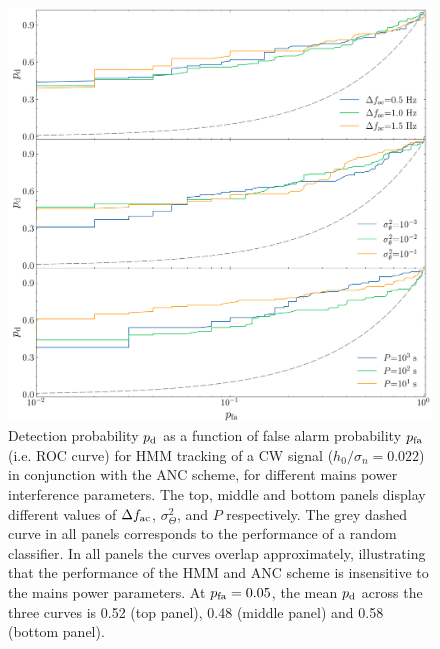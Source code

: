 \documentclass[pra,superscriptaddress,reprint,amsmath,amssymb,nofootinbib]{revtex4-2}
\begin{document}
\begin{figure}
	\begin{center}
		\includegraphics[width=\columnwidth]{images/roc_curve_mains_power_params}
	\end{center}
	\caption{Detection probability $p_{\rm d}$ as a function of false alarm probability $p_{\rm fa}$ (i.e. ROC curve) for HMM tracking of a CW signal ($h_0 / \sigma_n = 0.022$) in conjunction with the ANC scheme, for different mains power interference parameters. The top, middle and bottom panels display different values of $\Delta f_{\rm ac}$, $\sigma_{\Theta}^2$, and $P$ respectively. The grey dashed curve in all panels corresponds to the performance of a random classifier. In all panels the curves overlap approximately, illustrating that the performance of the HMM and ANC scheme is insensitive to the mains power parameters. At $p_{\rm fa} = 0.05$, the mean $p_{\rm d}$ across the three curves is 0.52 (top panel), 0.48 (middle panel) and 0.58 (bottom panel).}
	\label{fig:roc1}
\end{figure}
\end{document}
